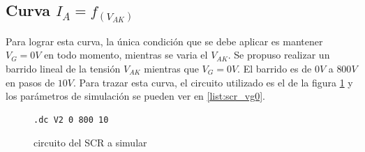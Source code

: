       \subsection{Curva $I_A = f_{(V_{AK})}$}
        Para lograr esta curva, la única condición que se debe aplicar es mantener $V_G = 0V$ en todo momento,
        mientras se varia el $V_{AK}$.
          Se propuso realizar un barrido lineal de la tensión $V_{AK}$ mientras que $V_G = 0V$. El barrido es de $0V$ a
          $800V$ en pasos de $10V$. Para trazar esta curva, el circuito utilizado es el de la figura \ref{crkt:scr_vg0}
          y los parámetros de simulación se pueden ver en \ref{list:scr_vg0}.
          \begin{figure}[!ht]
            \centering
            \begin{minipage}{0.45\textwidth}
              \centering
              
              \caption{circuito del SCR a simular}
              \label{crkt:scr_vg0}
            \end{minipage}
            \hfill
            \begin{minipage}{0.45\textwidth}
              \centering
            \begin{lstlisting}[style=ltspice, caption={Parámetros de simulación LTspice}, label=list:scr_vg0]
.dc V2 0 800 10
            \end{lstlisting}
            \end{minipage}
          \end{figure}

